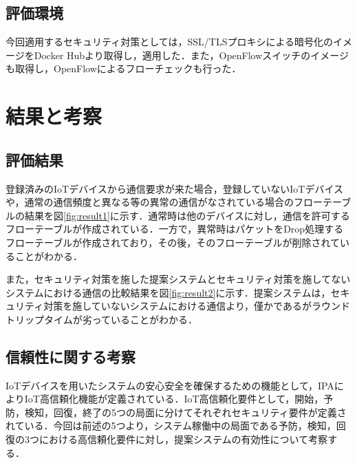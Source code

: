 \documentclass[Japanese]{dicomopapers}
\begin{document}
\subsection{評価環境}
今回適用するセキュリティ対策としては，SSL/TLSプロキシによる暗号化のイメージをDocker Hubより取得し，適用した．また，OpenFlowスイッチのイメージも取得し，OpenFlowによるフローチェックも行った．


\section{結果と考察}

\subsection{評価結果}
登録済みのIoTデバイスから通信要求が来た場合，登録していないIoTデバイスや，通常の通信頻度と異なる等の異常の通信がなされている場合のフローテーブルの結果を図\ref{fig:result1}に示す．通常時は他のデバイスに対し，通信を許可するフローテーブルが作成されている．一方で，異常時はパケットをDrop処理するフローテーブルが作成されており，その後，そのフローテーブルが削除されていることがわかる．\par
また，セキュリティ対策を施した提案システムとセキュリティ対策を施してないシステムにおける通信の比較結果を図\ref{fig:result2}に示す．提案システムは，セキュリティ対策を施していないシステムにおける通信より，僅かであるがラウンドトリップタイムが劣っていることがわかる．

\subsection{信頼性に関する考察}
IoTデバイスを用いたシステムの安心安全を確保するための機能として，IPAによりIoT高信頼化機能が定義されている．IoT高信頼化要件として，開始，予防，検知，回復，終了の5つの局面に分けてそれぞれセキュリティ要件が定義されている\cite{IPA}．今回は前述の5つより，システム稼働中の局面である予防，検知，回復の3つにおける高信頼化要件に対し，提案システムの有効性について考察する．
\end{document}
